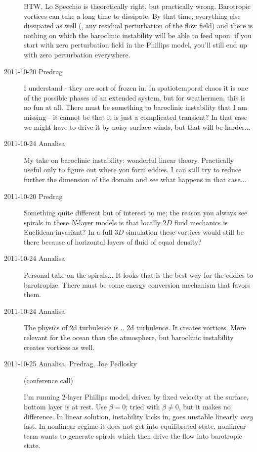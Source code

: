 \begin{description}
BTW, Lo Specchio  is theoretically right, but practically wrong.
Barotropic vortices can take a long time to dissipate. By that time,
everything else dissipated as well (\ie, any residual perturbation of the
flow field) and there is nothing on which the baroclinic instability will
be able to feed upon: if you start with zero perturbation field in the
Phillips model, you'll still end up with zero perturbation everywhere.

\item[2011-10-20 Predrag] I understand - they are sort of frozen in. In
spatiotemporal chaos it is one of the possible phases of an extended
system, but for weathermen, this is no fun at all. There must be
something to baroclinic instability that I am missing - it cannot be that it
is just a complicated transient? In that case we might have to drive it
by noisy surface winds, but that will be harder...

\item[2011-10-24 Annalisa]
My take on baroclinic instability: wonderful linear theory. Practically
useful only to figure out where you form eddies. I can still try to
reduce further the dimension of the domain and see what happens in that
case...

\item[2011-10-20 Predrag] Something quite different but of interest to me;
the reason you always see spirals in these $N$-layer models is that locally
$2D$ fluid mechanics is Euclidean-invariant? In a full $3D$ simulation these
vortices would still be there because of horizontal layers of fluid of equal density?

\item[2011-10-24 Annalisa]
Personal take on the spirals... It looks that is the best way for the
eddies to barotropize. There must be some energy conversion mechanism
that favors them.

\item[2011-10-24 Annalisa]
The physics of 2d turbulence is .. 2d turbulence. It creates vortices.
More relevant for the ocean than the atmosphere, but baroclinic
instability creates vortices as well.

\item[2011-10-25 Annalisa, Predrag, Joe Pedlosky] (conference call)

 I'm running 2-layer Phillips model, driven by fixed velocity at
the surface, bottom layer is at rest. Use $\beta=0$; tried with $\beta
\neq 0$, but it makes no difference. In linear solution, instability
kicks in, goes unstable linearly \emph{very} fast. In nonlinear regime it
does not get into equilibrated state, nonlinear term wants to generate
spirals which then drive the flow into barotropic state.


\end{description}
